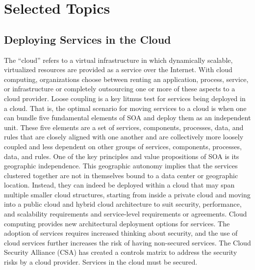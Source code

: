 \documentclass[12pt,a4paper,final,twoside,onecolumn,titlepage]{book}
\begin{document}
\section{Selected Topics}
\subsection{Deploying Services in the Cloud}
The “cloud” refers to a virtual infrastructure in which dynamically scalable, virtualized resources are provided as a service over the Internet. With cloud computing, organizations choose between renting an application, process, service, or infrastructure or completely outsourcing one or more of these aspects to a cloud provider.
Loose coupling is a key litmus test for services being deployed in a cloud. That is, the optimal scenario for moving services to a cloud is when one can bundle five fundamental elements of \gls{SOA} and deploy them as an independent unit. These five elements are a set of services, components, processes, data, and rules that are closely aligned with one another and are collectively more loosely coupled and less dependent on other groups of services, components, processes, data, and rules. One of the key principles and value propositions of \gls{SOA} is its geographic independence. This geographic autonomy implies that the services clustered together are not in themselves bound to a data center or geographic location. Instead, they can indeed be deployed within a cloud that may span multiple smaller cloud structures, starting from inside a private cloud and moving into a public cloud and hybrid cloud architecture to suit security, performance, and scalability requirements and service-level requirements or agreements. Cloud computing provides new architectural deployment options for services.
The adoption of services requires increased thinking about security, and the use of cloud services further increases the risk of having non-secured services. The Cloud Security Alliance (CSA) has created a controls matrix to address the security risks by a cloud provider. Services in the cloud must be secured.
\end{document}

